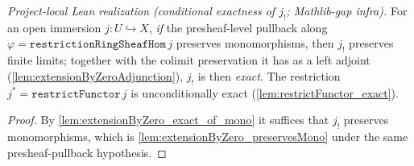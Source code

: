 \begin{lemma}

  \label{lem:extensionByZero_exact}
  \textit{Project-local Lean realization (conditional exactness of $j_!$;
  Mathlib-gap infra).}
  For an open immersion $j : U \hookrightarrow X$, \emph{if} the presheaf-level
  pullback along $\varphi = \mathtt{restrictionRingSheafHom}\,j$ preserves
  monomorphisms, then $j_!$ preserves finite limits; together with the colimit
  preservation it has as a left adjoint (\cref{lem:extensionByZeroAdjunction}),
  $j_!$ is then \emph{exact}. The restriction $j^{*} = \mathtt{restrictFunctor}\,j$
  is unconditionally exact (\cref{lem:restrictFunctor_exact}).
  \begin{proof}
    By \cref{lem:extensionByZero_exact_of_mono} it suffices that $j_!$ preserves
    monomorphisms, which is \cref{lem:extensionByZero_preservesMono} under the
    same presheaf-pullback hypothesis.
  \end{proof}
\end{lemma}

